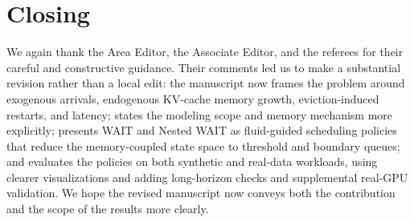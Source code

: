 \section*{Closing}

We again thank the Area Editor, the Associate Editor, and the referees for their careful and constructive guidance. Their comments led us to make a substantial revision rather than a local edit: the manuscript now frames the problem around exogenous arrivals, endogenous KV-cache memory growth, eviction-induced restarts, and latency; states the modeling scope and memory mechanism more explicitly; presents WAIT and Nested WAIT as fluid-guided scheduling policies that reduce the memory-coupled state space to threshold and boundary queues; and evaluates the policies on both synthetic and real-data workloads, using clearer visualizations and adding long-horizon checks and supplemental real-GPU validation. We hope the revised manuscript now conveys both the contribution and the scope of the results more clearly.

